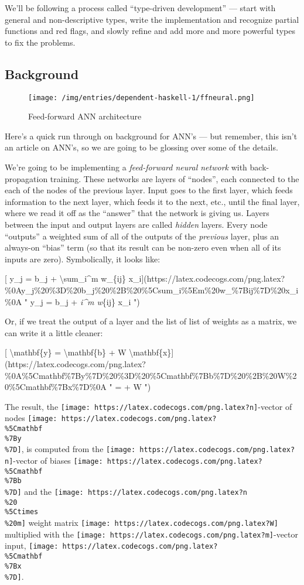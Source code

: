 \documentclass[]{article}
\begin{document}
We'll be following a process called ``type-driven development'' --- start with
general and non-descriptive types, write the implementation and recognize
partial functions and red flags, and slowly refine and add more and more
powerful types to fix the problems.

\hypertarget{background}{%
\subsection{Background}\label{background}}

\begin{figure}
\centering
\texttt{[image: /img/entries/dependent-haskell-1/ffneural.png]}
\caption{Feed-forward ANN architecture}
\end{figure}

Here's a quick run through on background for ANN's --- but remember, this isn't
an article on ANN's, so we are going to be glossing over some of the details.

We're going to be implementing a \emph{feed-forward neural network} with
back-propagation training. These networks are layers of ``nodes'', each
connected to the each of the nodes of the previous layer. Input goes to the
first layer, which feeds information to the next layer, which feeds it to the
next, etc., until the final layer, where we read it off as the ``answer'' that
the network is giving us. Layers between the input and output layers are called
\emph{hidden} layers. Every node ``outputs'' a weighted sum of all of the
outputs of the \emph{previous} layer, plus an always-on ``bias'' term (so that
its result can be non-zero even when all of its inputs are zero). Symbolically,
it looks like:

{[} y\_j = b\_j + \textbackslash{}sum\_i\^{}m w\_\{ij\}
x\_i{]}(https://latex.codecogs.com/png.latex?\%0Ay\_j\%20\%3D\%20b\_j\%20\%2B\%20\%5Csum\_i\%5Em\%20w\_\%7Bij\%7D\%20x\_i\%0A
" y\_j = b\_j + \sum\emph{i\^{}m w}\{ij\} x\_i ")

Or, if we treat the output of a layer and the list of list of weights as a
matrix, we can write it a little cleaner:

{[} \textbackslash{}mathbf\{y\} = \textbackslash{}mathbf\{b\} + W
\textbackslash{}mathbf\{x\}{]}(https://latex.codecogs.com/png.latex?\%0A\%5Cmathbf\%7By\%7D\%20\%3D\%20\%5Cmathbf\%7Bb\%7D\%20\%2B\%20W\%20\%5Cmathbf\%7Bx\%7D\%0A
"  =  + W  ")

The result, the \texttt{[image: https://latex.codecogs.com/png.latex?n]}-vector
of nodes
\texttt{[image: https://latex.codecogs.com/png.latex?\\\%5Cmathbf\\\%7By\\\%7D]}, is
computed from the
\texttt{[image: https://latex.codecogs.com/png.latex?n]}-vector of biases
\texttt{[image: https://latex.codecogs.com/png.latex?\\\%5Cmathbf\\\%7Bb\\\%7D]} and
the \texttt{[image: https://latex.codecogs.com/png.latex?n\\\%20\\\%5Ctimes\\\%20m]}
weight matrix \texttt{[image: https://latex.codecogs.com/png.latex?W]}
multiplied with the
\texttt{[image: https://latex.codecogs.com/png.latex?m]}-vector input,
\texttt{[image: https://latex.codecogs.com/png.latex?\\\%5Cmathbf\\\%7Bx\\\%7D]}.
\end{document}
